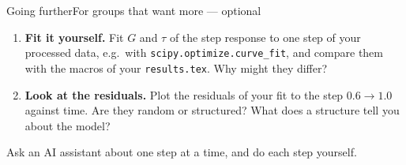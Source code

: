 %
\begin{frame}{Going further}{For groups that want more --- optional}
  \label{app:going-further}
  \small
  \begin{enumerate}\setlength{\itemsep}{8pt}
    \item \textbf{Fit it yourself.} Fit $G$ and $\tau$ of the step response to one step of your processed data, e.g.\ with \texttt{scipy.optimize.curve\_fit}, and compare them with the macros of your \texttt{results.tex}. Why might they differ?
    \item \textbf{Look at the residuals.} Plot the residuals of your fit to the step $0.6 \to 1.0$ against time. Are they \alert{random or structured}? What does a structure tell you about the model?
  \end{enumerate}
  \vspace{8pt}
  Ask an AI assistant about one step at a time, and do each step yourself.
\end{frame}
